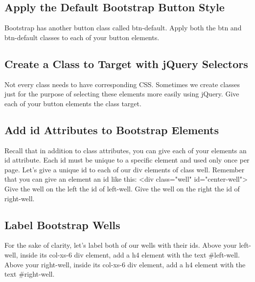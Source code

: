 \documentclass{article}%
\begin{document}
%
\subsection{Apply the Default Bootstrap Button Style}%
\label{subsec:ApplytheDefaultBootstrapButtonStyle}%
Bootstrap has another button class called btn{-}default.\newline%
Apply both the btn and btn{-}default classes to each of your button elements.\newline%

%
\subsection{Create a Class to Target with jQuery Selectors}%
\label{subsec:CreateaClasstoTargetwithjQuerySelectors}%
Not every class needs to have corresponding CSS. Sometimes we create classes just for the purpose of selecting these elements more easily using jQuery.\newline%
Give each of your button elements the class target.\newline%

%
\subsection{Add id Attributes to Bootstrap Elements}%
\label{subsec:AddidAttributestoBootstrapElements}%
Recall that in addition to class attributes, you can give each of your elements an id attribute.\newline%
Each id must be unique to a specific element and used only once per page.\newline%
Let's give a unique id to each of our div elements of class well.\newline%
Remember that you can give an element an id like this:\newline%
<div class="well" id="center{-}well">\newline%
Give the well on the left the id of left{-}well. Give the well on the right the id of right{-}well.\newline%

%
\subsection{Label Bootstrap Wells}%
\label{subsec:LabelBootstrapWells}%
For the sake of clarity, let's label both of our wells with their ids.\newline%
Above your left{-}well, inside its col{-}xs{-}6 div element, add a h4 element with the text \#left{-}well.\newline%
Above your right{-}well, inside its col{-}xs{-}6 div element, add a h4 element with the text \#right{-}well.\newline%
\end{document}
